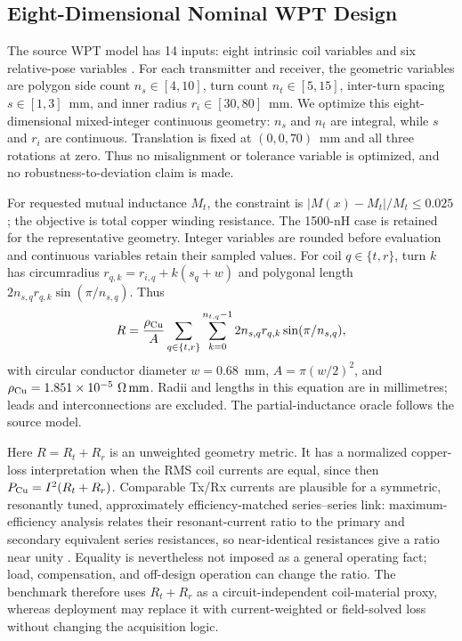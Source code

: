 \documentclass[conference]{IEEEtran}
\begin{document}
\subsection{Eight-Dimensional Nominal WPT Design}
The source WPT model has 14 inputs: eight intrinsic coil variables and six relative-pose variables \cite{asadi2025}. For each transmitter and receiver, the geometric variables are polygon side count $n_s\in[4,10]$, turn count $n_t\in[5,15]$, inter-turn spacing $s\in[1,3]$~mm, and inner radius $r_i\in[30,80]$~mm. We optimize this eight-dimensional mixed-integer continuous geometry: $n_s$ and $n_t$ are integral, while $s$ and $r_i$ are continuous. Translation is fixed at $(0,0,70)$~mm and all three rotations at zero. Thus no misalignment or tolerance variable is optimized, and no robustness-to-deviation claim is made.

For requested mutual inductance $M_t$, the constraint is $|M(x)-M_t|/M_t\leq0.025$; the objective is total copper winding resistance. The 1500-nH case is retained for the representative geometry. Integer variables are rounded before evaluation and continuous variables retain their sampled values. For coil $q\in\{t,r\}$, turn $k$ has circumradius $r_{q,k}=r_{i,q}+k(s_q+w)$ and polygonal length $2n_{s,q}r_{q,k}\sin(\pi/n_{s,q})$. Thus
\begin{equation}
 R=\frac{\rho_{\rm Cu}}{A}\sum_{q\in\{t,r\}}\sum_{k=0}^{n_{t,q}-1}
 2n_{s,q}r_{q,k}\sin(\pi/n_{s,q}),
\end{equation}
with circular conductor diameter $w=0.68$~mm, $A=\pi(w/2)^2$, and $\rho_{\rm Cu}=1.851\times10^{-5}~\Omega\,{\rm mm}$. Radii and lengths in this equation are in millimetres; leads and interconnections are excluded. The partial-inductance oracle follows the source model.

Here $R=R_t+R_r$ is an unweighted geometry metric. It has a normalized copper-loss interpretation when the RMS coil currents are equal, since then $P_{\rm Cu}=I^2(R_t+R_r)$. Comparable Tx/Rx currents are plausible for a symmetric, resonantly tuned, approximately efficiency-matched series--series link: maximum-efficiency analysis relates their resonant-current ratio to the primary and secondary equivalent series resistances, so near-identical resistances give a ratio near unity \cite{zhang2019mept}. Equality is nevertheless not imposed as a general operating fact; load, compensation, and off-design operation can change the ratio. The benchmark therefore uses $R_t+R_r$ as a circuit-independent coil-material proxy, whereas deployment may replace it with current-weighted or field-solved loss without changing the acquisition logic.
\end{document}
